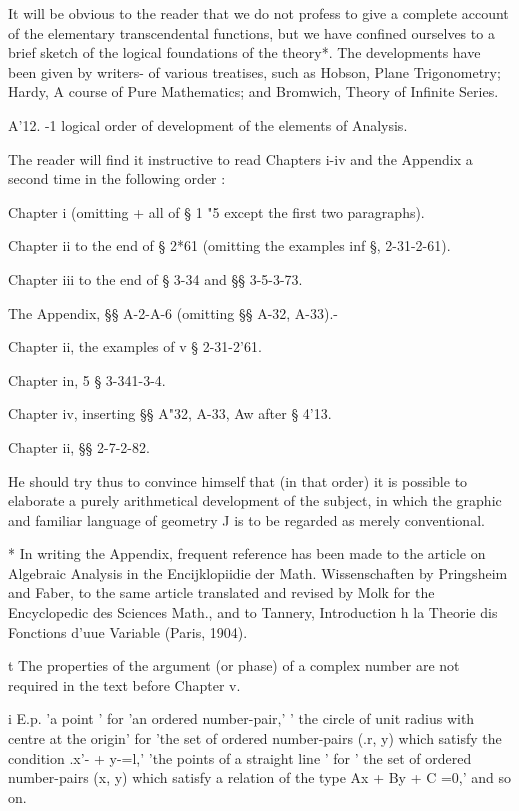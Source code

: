 It will be obvious to the reader that we do not profess to give a
complete account of the elementary transcendental functions, but we
have confined ourselves to a brief sketch of the logical foundations
of the theory*. The developments have been given by writers- of
various treatises, such as Hobson, Plane Trigonometry; Hardy, A
course of Pure Mathematics; and Bromwich, Theory of Infinite Series.

A'12. -1 logical order of development of the elements of Analysis.

The reader will find it instructive to read Chapters i-iv and the
Appendix a second time in the following order :

Chapter i (omitting + all of § 1 "5 except the first two paragraphs).

Chapter ii to the end of § 2*61 (omitting the examples inf §,
2-31-2-61).

Chapter iii to the end of § 3-34 and §§ 3-5-3-73.

The Appendix, §§ A-2-A-6 (omitting §§ A-32, A-33).-

Chapter ii, the examples of v § 2-31-2'61.

Chapter in, 5 § 3-341-3-4.

Chapter iv, inserting §§ A"32, A-33, Aw after § 4'13.

Chapter ii, §§ 2-7-2-82.

He should try thus to convince himself that (in that order) it is
possible to elaborate a purely arithmetical development of the
subject, in which the graphic and familiar language of geometry J is
to be regarded as merely conventional.

* In writing the Appendix, frequent reference has been made to the
article on Algebraic Analysis in the Encijklopiidie der Math.
Wissenschaften by Pringsheim and Faber, to the same article translated
and revised by Molk for the Encyclopedic des Sciences Math., and to
Tannery, Introduction h la Theorie dis Fonctions d'uue Variable
(Paris, 1904).

t The properties of the argument (or phase) of a complex number are
not required in the text before Chapter v.

i E.p. 'a point ' for 'an ordered number-pair,' ' the circle of unit
radius with centre at the origin' for 'the set of ordered number-pairs
(.r, y) which satisfy the condition .x'- + y-=l,' 'the points of a
straight line ' for ' the set of ordered number-pairs (x, y) which
satisfy a relation of the type Ax + By + C =0,' and so on.



